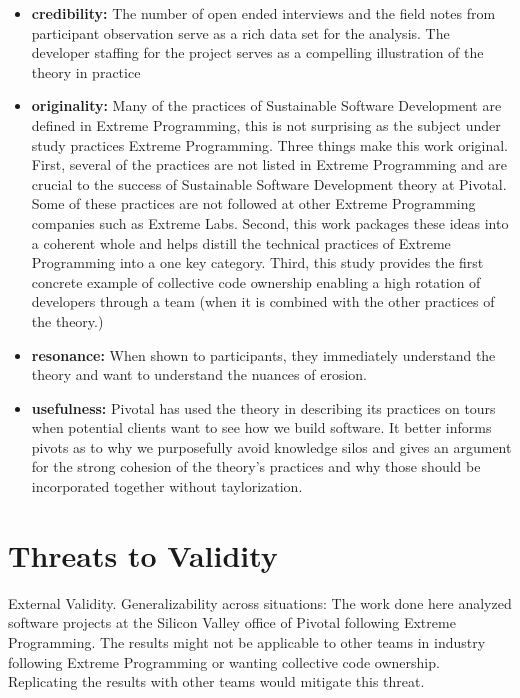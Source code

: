 \begin{itemize}
\item 
\textbf{credibility:}  The number of open ended interviews and the field notes from participant observation serve as a rich data set for the analysis. The developer staffing for the project serves as a compelling illustration of the theory in practice

\item
\textbf{originality:} Many of the practices of Sustainable Software Development are defined in Extreme Programming, this is not surprising as the subject under study practices Extreme Programming. Three things make this work original. First, several of the practices are not listed in Extreme Programming and are crucial to the success of Sustainable Software Development theory at Pivotal. Some of these practices are not followed at other Extreme Programming companies such as Extreme Labs. Second, this work packages these ideas into a coherent whole and helps distill the technical practices of Extreme Programming into a one key category. Third, this study provides the first concrete example of collective code ownership enabling a high rotation of developers through a team (when it is combined with the other practices of the theory.)

\item
\textbf{resonance:} When shown to participants, they immediately understand the theory and want to understand the nuances of erosion.

\item
\textbf{usefulness:} Pivotal has used the theory in describing its practices on tours when potential clients want to see how we build software. It better informs pivots as to why we purposefully avoid knowledge silos and gives an argument for the strong cohesion of the theory's practices and why those should be incorporated together without taylorization. 
\end{itemize}

\section{Threats to Validity}

External Validity. Generalizability across situations: The work done here analyzed software projects at the Silicon Valley office of Pivotal following Extreme Programming. The results might not be applicable to other teams in industry following Extreme Programming or wanting collective code ownership. Replicating the results with other teams would mitigate this threat.

